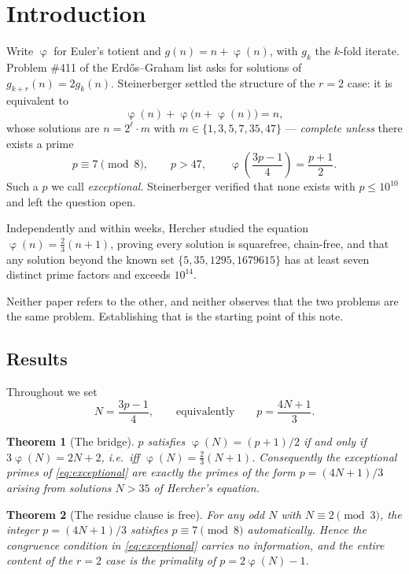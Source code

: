 \documentclass[11pt,reqno]{amsart}
\theoremstyle{plain}
\newtheorem{theorem}{Theorem}[section]
\theoremstyle{definition}
\DeclareMathOperator{\tot}{\varphi}
\begin{document}
\section{Introduction}

Write $\tot$ for Euler's totient and $g(n)=n+\tot(n)$, with $g_k$ the $k$-fold iterate.
Problem \#411 of the Erd\H{o}s--Graham list asks for solutions of $g_{k+r}(n)=2g_k(n)$.
Steinerberger \cite{Stein} settled the structure of the $r=2$ case: it is equivalent to
\begin{equation}\label{eq:stein}
  \tot(n)+\tot\big(n+\tot(n)\big)=n ,
\end{equation}
whose solutions are $n=2^{\ell}\cdot m$ with $m\in\{1,3,5,7,35,47\}$ --- \emph{complete unless}
there exists a prime
\begin{equation}\label{eq:exceptional}
  p\equiv 7 \pmod 8,\qquad p>47,\qquad \tot\!\left(\frac{3p-1}{4}\right)=\frac{p+1}{2}.
\end{equation}
Such a $p$ we call \emph{exceptional}. Steinerberger verified that none exists with
$p\le 10^{10}$ and left the question open.

Independently and within weeks, Hercher \cite{Herch} studied the equation
$\tot(n)=\tfrac23(n+1)$, proving every solution is squarefree, chain-free, and that any
solution beyond the known set $\{5,35,1295,1679615\}$ has at least seven distinct prime
factors and exceeds $10^{14}$.

Neither paper refers to the other, and neither observes that the two problems are the same
problem. Establishing that is the starting point of this note.

\subsection*{Results}
Throughout we set
\[
  N=\frac{3p-1}{4},\qquad\text{equivalently}\qquad p=\frac{4N+1}{3}.
\]

\begin{theorem}[The bridge]\label{thm:bridge}
$p$ satisfies $\tot(N)=(p+1)/2$ if and only if $3\tot(N)=2N+2$, i.e.\ iff
$\tot(N)=\tfrac23(N+1)$. Consequently the exceptional primes of \eqref{eq:exceptional} are
exactly the primes of the form $p=(4N+1)/3$ arising from solutions $N>35$ of Hercher's
equation.
\end{theorem}

\begin{theorem}[The residue clause is free]\label{thm:free}
For \emph{any} odd $N$ with $N\equiv2\pmod3$, the integer $p=(4N+1)/3$ satisfies
$p\equiv7\pmod8$ automatically. Hence the congruence condition in \eqref{eq:exceptional}
carries no information, and the entire content of the $r=2$ case is the primality of
$p=2\tot(N)-1$.
\end{theorem}
\end{document}
